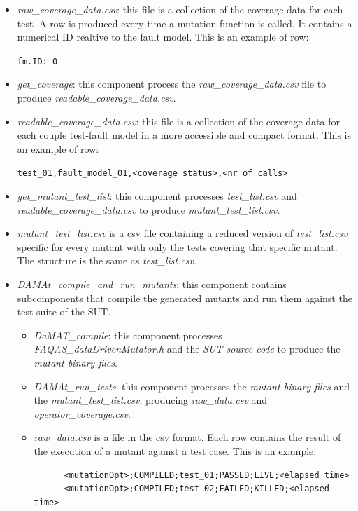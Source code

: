 \begin{itemize}
\begin{itemize}
    \item \textit{raw\_coverage\_data.csv}: this file is a collection of the coverage data for each test. A row is produced every time a mutation function is called. It contains a numerical ID realtive to the fault model.
    This is an example of row:

    \texttt{fm.ID: 0}

    \item \textit{get\_coverage}: this component process the \textit{raw\_coverage\_data.csv} file to produce \textit{readable\_coverage\_data.csv}.

    \item \textit{readable\_coverage\_data.csv}: this file is a collection of the coverage data for each couple test-fault model in a more accessible and compact format.
    This is an example of row:

    \texttt{test\_01,fault\_model\_01,<coverage status>,<nr of calls>}

    \item \textit{get\_mutant\_test\_list}: this component processes \textit{test\_list.csv} and \textit{readable\_coverage\_data.csv} to produce \textit{mutant\_test\_list.csv}.

    \item \textit{mutant\_test\_list.csv} is a csv file containing a reduced version of \textit{test\_list.csv} specific for every mutant with only the tests covering that specific mutant. The structure is the same as \textit{test\_list.csv}.

    \item \textit{DAMAt\_compile\_and\_run\_mutants}: this component contains subcomponents that compile the generated mutants and run them against the test suite of the SUT.
    \begin{itemize}
      \item \textit{DaMAT\_compile}: this component processes \textit{FAQAS\_dataDrivenMutator.h} and the \textit{SUT source code} to produce the \textit{mutant binary files}.
      \item \textit{DAMAt\_run\_tests}: this component processes the \textit{mutant binary files} and the \textit{mutant\_test\_list.csv}, producing \textit{raw\_data.csv} and \textit{operator\_coverage.csv}.
      \item \textit{raw\_data.csv} is a file in the csv format. Each row contains the result of the execution of a mutant against a test case.
      This is an example:

      \begin{lstlisting}
      <mutationOpt>;COMPILED;test_01;PASSED;LIVE;<elapsed time>
      <mutationOpt>;COMPILED;test_02;FAILED;KILLED;<elapsed time>
      \end{lstlisting}


\end{itemize}
\end{itemize}
\end{itemize}
